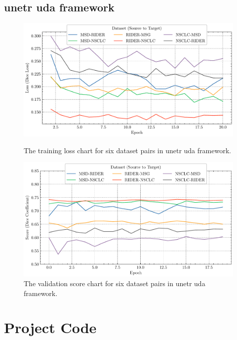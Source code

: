 \documentclass[11pt,times,oneside,openright]{eeereport}
\begin{document}
\begin{appendices}
\section{\acrshort{unetr} \acrshort{uda} framework}
\begin{figure}[!htb]
   \begin{minipage}{0.48\textwidth}
     \centering
     \includegraphics[width=\linewidth]{fig/result/unetr_uda_train.pdf}
     \caption{The training loss chart for six dataset pairs in \acrshort{unetr} \acrshort{uda} framework.}\label{fig:app_unetr_uda_train}
   \end{minipage}\hfill
   \begin{minipage}{0.48\textwidth}
     \centering
     \includegraphics[width=\linewidth]{fig/result/unetr_uda_val.pdf}
     \caption{The validation score chart for six dataset pairs in \acrshort{unetr} \acrshort{uda} framework.
}\label{fig:app_unetr_uda_val}
   \end{minipage}
\end{figure}

\chapter{Project Code}

\end{appendices}
\end{document}
